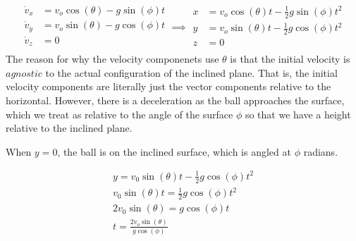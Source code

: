 \documentclass{article}
\begin{document}
\begin{equation}
    \begin{aligned}
        \dot{v}_x & = v_o \cos(\theta) - g\sin(\phi)t \\
        \dot{v}_y & = v_o \sin(\theta) - g\cos(\phi)t \\
        \dot{v}_z & =  0                              \\
    \end{aligned}
    \implies
    \begin{aligned}
        x & = v_o \cos(\theta)t - \frac{1}{2}g\sin(\phi)t^2 \\
        y & = v_o \sin(\theta)t - \frac{1}{2}g\cos(\phi)t^2 \\
        z & =  0                                            \\
    \end{aligned}
\end{equation}
The reason for why the velocity componenets use $\theta$ is that the initial velocity is $\textit{agnostic}$ to the actual configuration of the inclined plane. That is, the initial velocity components are literally just the vector components relative to the horizontal. However, there is a deceleration as the ball approaches the surface, which we treat as relative to the angle of the surface $\phi$ so that we have a height relative to the inclined plane.

When $y = 0$, the ball is on the inclined surface, which is angled at $\phi$ radians.

\begin{equation}
    \begin{aligned}
        y = v_0 \sin(\theta)t - \frac{1}{2}g\cos(\phi)t^2 \\
        v_0 \sin(\theta)t = \frac{1}{2}g\cos(\phi)t^2     \\
        2v_0 \sin(\theta) = g\cos(\phi)t                  \\
        \boxed{t = \frac{2v_o \sin(\theta)}{g\cos(\phi)}}
    \end{aligned}
\end{equation}
\end{document}

